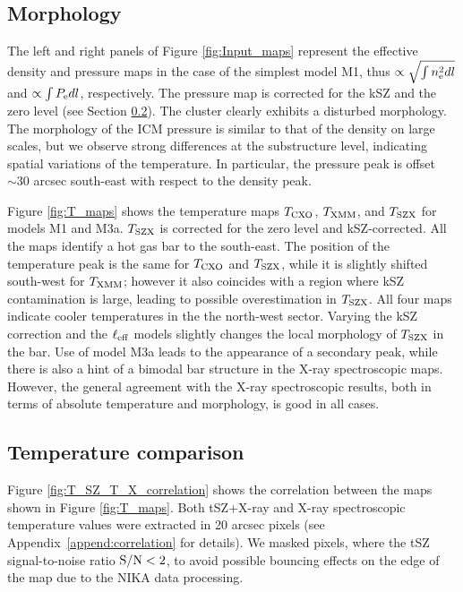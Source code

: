 \documentclass[twocolumn,traditabstract]{aa}
\def\xe {n_{\rm e}}
\def\pe {P_{\rm e}}
\def\TSZ {T_{\rm SZX}}
\def \TXC {T_{\rm CXO}}
\def \TXX {T_{\rm XMM}}
\begin{document}
\subsection{Morphology}
The left and right panels of Figure \ref{fig:Input_maps} represent the effective density and pressure maps in the case of the simplest model M1, thus $\propto \sqrt{\int\xe^2 dl}$ and $\propto \int \pe dl$, respectively. The pressure map is corrected for the kSZ and the zero level (see Section \ref{sec:compT}). The cluster clearly exhibits a disturbed morphology. The morphology of the ICM pressure is similar to that of the density on large scales, but we observe strong differences at the substructure level, indicating spatial variations of the temperature. In particular, the pressure peak is offset $\sim 30$ arcsec south-east with respect to the density peak.

Figure \ref{fig:T_maps} shows the temperature maps ${T}_{\rm CXO}$, ${T}_{\rm XMM}$, and $\TSZ$ for models M1 and M3a. $\TSZ$ is corrected for the zero level and kSZ-corrected. All the maps identify a hot gas bar to the south-east. The position of the temperature peak is the same for $\TXC$ and $\TSZ$, while it is slightly shifted south-west for $\TXX$; however it also coincides with a region where kSZ contamination is large, leading to possible overestimation in $\TSZ$. All four maps indicate cooler temperatures in the the north-west sector. Varying the kSZ correction and the $\ell_{\rm eff}$ models slightly changes the local morphology of $\TSZ$ in the bar. Use of model M3a leads to the appearance of a secondary peak, while there is also a hint of a bimodal bar structure in the X-ray spectroscopic maps. However, the general agreement with the X-ray spectroscopic results, both in terms of absolute temperature and morphology, is good in all cases. 

\subsection{Temperature comparison}\label{sec:compT}
Figure \ref{fig:T_SZ_T_X_correlation} shows the correlation between the maps shown in Figure \ref{fig:T_maps}. Both tSZ+X-ray and X-ray spectroscopic temperature values were extracted in 20 arcsec pixels (see Appendix~\ref{append:correlation} for details). We masked pixels, where the tSZ signal-to-noise ratio ${\rm S/N} < 2$, to avoid possible bouncing effects on the edge of the map due to the NIKA data processing.
\end{document}
